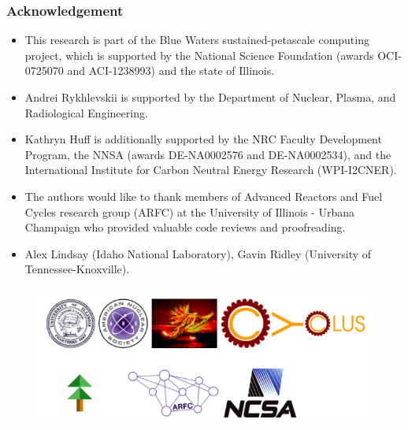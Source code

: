 \begin{frame}
  \frametitle{Acknowledgement}
  \begin{itemize}
    \item This research is part of the Blue Waters sustained-petascale computing project, 
which is supported by the National Science Foundation (awards OCI-0725070 and 
ACI-1238993) and the state of Illinois.
    \item Andrei Rykhlevskii is supported by the Department of Nuclear, Plasma, and Radiological Engineering.
    \item Kathryn Huff is additionally supported by the NRC Faculty Development Program, the NNSA (awards 
    DE-NA0002576 and DE-NA0002534), and the International Institute for Carbon Neutral Energy Research (WPI-I2CNER).
    \item The authors would like to thank  members of Advanced Reactors and Fuel Cycles
research group (ARFC) at the University of Illinois - Urbana Champaign who 
provided valuable code reviews and proofreading.
    \item Alex Lindsay (Idaho National Laboratory), Gavin Ridley (University of Tennessee-Knoxville).
  \end{itemize}
    \begin{figure}[t]
   \hspace*{-0.4in}
   \includegraphics[height=0.35\textheight]{./images/acks.png}
    \end{figure}
\end{frame}
